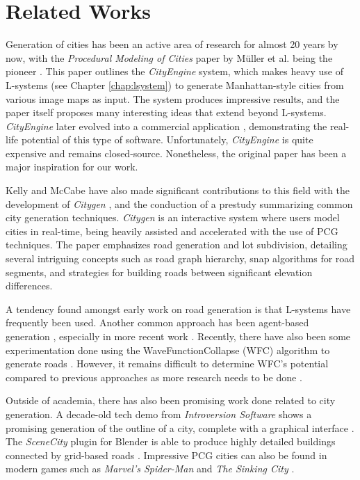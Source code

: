 \section{Related Works}

Generation of cities has been an active area of research for almost 20 years by now, with the \textit{Procedural Modeling of Cities} paper by Müller et al. being the pioneer \cite{muller_city_gen}.
This paper outlines the \textit{CityEngine} system, which makes heavy use of L-systems (see Chapter \ref{chap:lsystem}) to generate Manhattan-style cities from various image maps as input.
The system produces impressive results, and the paper itself proposes many interesting ideas that extend beyond L-systems.
\textit{CityEngine} later evolved into a commercial application \cite{esri}, demonstrating the real-life potential of this type of software.
Unfortunately, \textit{CityEngine} is quite expensive and remains closed-source.
Nonetheless, the original paper has been a major inspiration for our work.

Kelly and McCabe have also made significant contributions to this field with the development of \textit{Citygen} \cite{citygen_paper}, and the conduction of a prestudy \cite{citygen_paper_prestudy} summarizing common city generation techniques. 
\textit{Citygen} is an interactive system where users model cities in real-time, being heavily assisted and accelerated with the use of PCG techniques.
The paper emphasizes road generation and lot subdivision, detailing several intriguing concepts such as road graph hierarchy, snap algorithms for road segments, and strategies for building roads between significant elevation differences.

A tendency found amongst early work on road generation is that L-systems have frequently been used.
Another common approach has been agent-based generation \cite{agent_based_roads}, especially in more recent work \cite{tmwhere} \cite{robin}.
Recently, there have also been some experimentation done using the WaveFunctionCollapse (WFC) algorithm \cite{wavefunc} to generate roads \cite{wavefunc_roads}.
However, it remains difficult to determine WFC's potential compared to previous approaches as more research needs to be done \cite[p.50]{wavefunc_roads}.

Outside of academia, there has also been promising work done related to city generation.
A decade-old tech demo from \textit{Introversion Software} shows a promising generation of the outline of a city, complete with a graphical interface \cite{subversion}.
The \textit{SceneCity} plugin for Blender \cite{blender} is able to produce highly detailed buildings connected by grid-based roads \cite{scenecity}.
Impressive PCG cities can also be found in modern games such as \textit{Marvel's Spider-Man} \cite{pcg_spiderman} and \textit{The Sinking City} \cite{pcg_sunken_city}.


